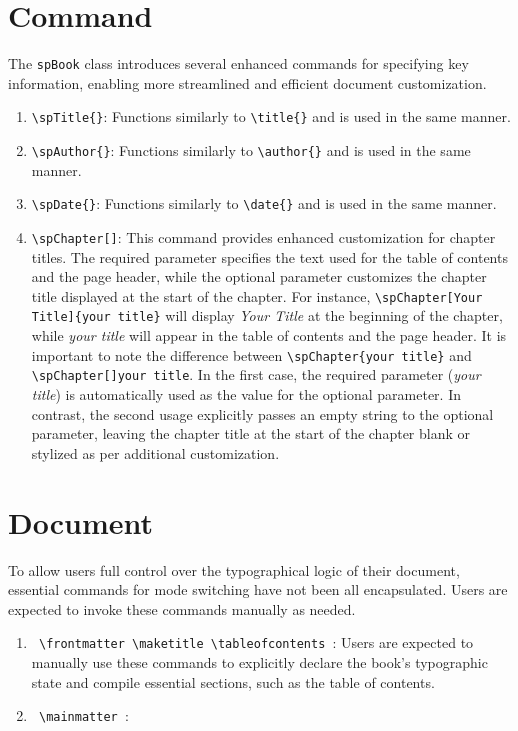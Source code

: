 \section{Command}
    The \texttt{spBook} class introduces several enhanced commands for specifying key information, enabling more streamlined and efficient document customization.
    \begin{enumerate}
        \item \texttt{\textbackslash spTitle\{\}}: Functions similarly to \texttt{\textbackslash title\{\}} and is used in the same manner.
        \item \texttt{\textbackslash spAuthor\{\}}: Functions similarly to \texttt{\textbackslash author\{\}} and is used in the same manner.
        \item \texttt{\textbackslash spDate\{\}}: Functions similarly to \texttt{\textbackslash date\{\}} and is used in the same manner.
        \item \texttt{\textbackslash spChapter[]{}}: This command provides enhanced customization for chapter titles. The required parameter specifies the text used for the table of contents and the page header, while the optional parameter customizes the chapter title displayed at the start of the chapter. For instance, \texttt{\textbackslash spChapter[Your Title]\{your title\}} will display \emph{Your Title} at the beginning of the chapter, while \emph{your title} will appear in the table of contents and the page header. It is important to note the difference between \texttt{\textbackslash spChapter\{your title\}} and \texttt{\textbackslash spChapter[]{your title}}. In the first case, the required parameter (\emph{your title}) is automatically used as the value for the optional parameter. In contrast, the second usage explicitly passes an empty string to the optional parameter, leaving the chapter title at the start of the chapter blank or stylized as per additional customization.
    \end{enumerate}

\section{Document}
    To allow users full control over the typographical logic of their document, essential commands for mode switching have not been all encapsulated. Users are expected to invoke these commands manually as needed.

    \begin{enumerate}
        \item \texttt{%
            \textbackslash frontmatter
            \textbackslash maketitle
            \textbackslash tableofcontents
        }: Users are expected to manually use these commands to explicitly declare the book's typographic state and compile essential sections, such as the table of contents.
        \item \texttt{%
            \textbackslash mainmatter
        }: 
    \end{enumerate}
